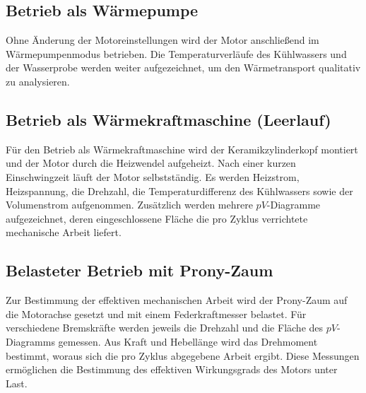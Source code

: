 \subsection{Betrieb als Wärmepumpe}

Ohne Änderung der Motoreinstellungen wird der Motor anschließend im Wärmepumpenmodus betrieben. Die Temperaturverläufe des Kühlwassers und der Wasserprobe werden weiter aufgezeichnet, um den Wärmetransport qualitativ zu analysieren.

\subsection{Betrieb als Wärmekraftmaschine (Leerlauf)}

Für den Betrieb als Wärmekraftmaschine wird der Keramikzylinderkopf montiert und der Motor durch die Heizwendel aufgeheizt. Nach einer kurzen Einschwingzeit läuft der Motor selbstständig. Es werden Heizstrom, Heizspannung, die Drehzahl, die Temperaturdifferenz des Kühlwassers sowie der Volumenstrom aufgenommen. Zusätzlich werden mehrere \(pV\)-Diagramme aufgezeichnet, deren eingeschlossene Fläche die pro Zyklus verrichtete mechanische Arbeit liefert.

\subsection{Belasteter Betrieb mit Prony-Zaum}

Zur Bestimmung der effektiven mechanischen Arbeit wird der Prony-Zaum auf die Motorachse gesetzt und mit einem Federkraftmesser belastet. Für verschiedene Bremskräfte werden jeweils die Drehzahl und die Fläche des \(pV\)-Diagramms gemessen. Aus Kraft und Hebellänge wird das Drehmoment bestimmt, woraus sich die pro Zyklus abgegebene Arbeit ergibt. Diese Messungen ermöglichen die Bestimmung des effektiven Wirkungsgrads des Motors unter Last.

